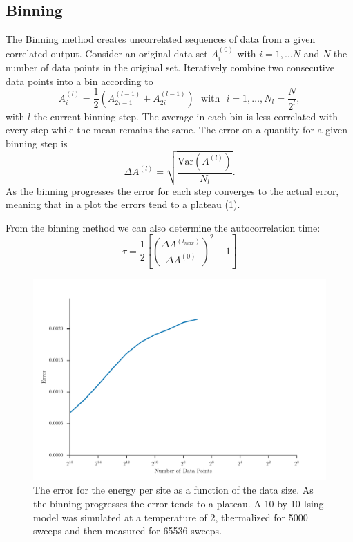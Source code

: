 \documentclass[11pt, a4paper]{report} %
\begin{document}
\subsection{Binning}

The Binning method creates uncorrelated sequences of data from a given correlated output.
Consider an original data set \(A_i^{(0)}\) with \(i = 1, \ldots N\) and \(N\) the number of data points in the original set.
Iteratively combine two consecutive data points into a bin according to
\begin{equation}
	A_i^(l) = \frac{1}{2} \left(A_{2i-1}^{(l-1)} + A_{2i}^{(l-1)} \right) \mathrm{\ \ \ with \ \ \ } i = 1, \ldots, N_l = \frac{N}{2^l},
\end{equation}
with \(l\) the current binning step.
The average in each bin is less correlated with every step while the mean remains the same.
The error on a quantity for a given binning step is
\begin{equation}
	\label{eq:basic_error}
	\Delta A^{(l)} = \sqrt{\frac{\mathrm{Var}(A^{(l)})}{N_l}}.
\end{equation}
As the binning progresses the error for each step converges to the actual error, meaning that in a plot the errors tend to a plateau (\cref{fig:binning_error_convergence}).

From the binning method we can also determine the autocorrelation time:\cite{corboz}
\begin{equation}
	\tau = \frac{1}{2} \left[\left( \frac{\Delta A^{(l_{max})}}{\Delta A^{(0)}} \right)^2- 1 \right]
\end{equation}
\begin{figure}[h]
	\centering
	\includegraphics[width=\textwidth]{ising_metropolis_energy_per_site_error_binning.pdf}
	\caption{The error for the energy per site as a function of the data size. As the binning progresses the error tends to a plateau. A 10 by 10 Ising model was simulated at a temperature of 2, thermalized for 5000 sweeps and then measured for 65536 sweeps.}
	\label{fig:binning_error_convergence}
\end{figure}
\end{document}
